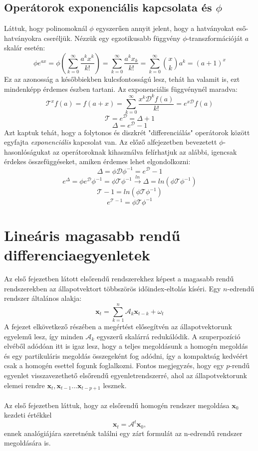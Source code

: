 \documentclass[14p]{article}
\begin{document}
\subsection{Operátorok exponenciális kapcsolata és $\phi$}
Láttuk, hogy polinomoknál $\phi$ egyszerűen annyit jelent, hogy a hatványokat eső-hatványokra cseréljük. Nézzük egy egzotikusabb függvény $\phi$-transzformációját $a$ skalár esetén:
\[
	\phi e^{ax} = \phi(\sum_{k=0}^{\infty} \frac{a^k x^k}{k!}) = \sum_{k=0}^{\infty} \frac{ a^k x_k}{k!} = \sum_{k=0}^{\infty} {x \choose k} a^k = (a+1)^x
\]
Ez az azonosság a későbbiekben kulcsfontosságú lesz, tehát ha valamit is, ezt mindenképp érdemes észben tartani.
Az exponenciális függvénynél maradva:
\[
	\mathcal{T}^x f(a) = f(a+x) = \sum_{k=0}^{\infty} \frac{x^k\mathcal{D}^k f(a)}{k!} = e^{x\mathcal{D}} f(a)
\]
\[
	\mathcal{T} = e^{\mathcal{D}} = \Delta + 1
\]
\[
	\Delta = e^{\mathcal{D}} - 1
\]
Azt kaptuk tehát, hogy a folytonos és diszkrét "differenciálás" operátorok között egyfajta 
\emph{exponenciális} kapcsolat van. Az előző alfejezetben bevezetett  $\phi$-
hasonlóságukat az operátoroknak kihasználva felírhatjuk az alábbi,
 igencsak érdekes összefüggéseket, amiken érdemes lehet elgondolkozni:
\[
	\Delta = \phi \mathcal{D} \phi^{-1} = e^{\mathcal{D}} - 1 
\]
\[
	e^{\Delta} = \phi e^{\mathcal{D}}\phi^{-1} = \phi \mathcal{T} \phi^{-1} \xrightarrow{ln} \Delta = ln(\phi\mathcal{T}\phi^{-1})
\]
\[
	\mathcal{T} - 1 = ln(\phi\mathcal{T}\phi^{-1})
\]
\[
	e^{\mathcal{T} - 1} = \phi \mathcal{T} \phi^{-1}
\]
\section{Lineáris magasabb rendű differenciaegyenletek}
Az első fejezetben látott elsőrendű rendszerekhez képest a magasabb rendű rendszerekben az állapotvektort többszörös időindex-eltolás kíséri. Egy $n$-edrendű rendszer általános alakja:
\[
	\pmb{x}_t = \sum_{k=1}^{n}{\mathcal{A}_{k}\pmb{x}_{t-k}} + \omega_{t}
\]
A fejezet elkövetkező részében a megértést elősegítvén az állapotvektorunk egyelemű lesz, így minden $\mathcal{A}_k$ egyszerű skalárrá redukálódik. A szuperpozíció elvéből adódóan itt is igaz lesz, hogy a teljes megoldásunk a homogén megoldás és egy partikuláris megoldás összegeként fog adódni, így a kompaktság kedvéért csak a homogén esettel fogunk foglalkozni. Fontos megjegyzés, hogy egy $p$-rendű egyenlet visszavezethető elsőrendű egyenletrendszerré, ahol az állapotvektorunk elemei rendre $\pmb{x}_t, \pmb{x}_{t-1} \dots \pmb{x}_{t-p+1}$ lesznek.
\\
\\
Az első fejezetben láttuk, hogy az elsőrendű homogén rendszer megoldása $\pmb{x}_0$ kezdeti értékkel
\[
	\pmb{x}_t = \mathcal{A}^t\pmb{x}_0,
\]
ennek analógiájára szeretnénk találni egy zárt formulát az n-edrendű rendszer megoldására is.
\end{document}
